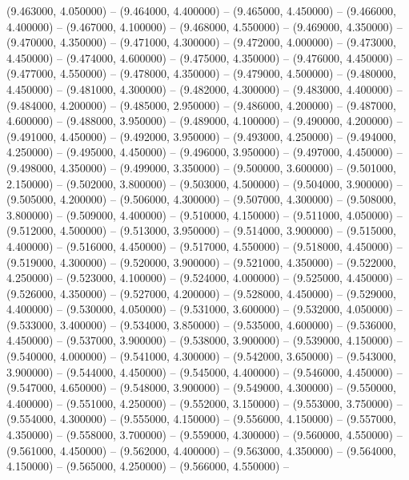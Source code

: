 (9.463000, 4.050000) -- 
(9.464000, 4.400000) -- 
(9.465000, 4.450000) -- 
(9.466000, 4.400000) -- 
(9.467000, 4.100000) -- 
(9.468000, 4.550000) -- 
(9.469000, 4.350000) -- 
(9.470000, 4.350000) -- 
(9.471000, 4.300000) -- 
(9.472000, 4.000000) -- 
(9.473000, 4.450000) -- 
(9.474000, 4.600000) -- 
(9.475000, 4.350000) -- 
(9.476000, 4.450000) -- 
(9.477000, 4.550000) -- 
(9.478000, 4.350000) -- 
(9.479000, 4.500000) -- 
(9.480000, 4.450000) -- 
(9.481000, 4.300000) -- 
(9.482000, 4.300000) -- 
(9.483000, 4.400000) -- 
(9.484000, 4.200000) -- 
(9.485000, 2.950000) -- 
(9.486000, 4.200000) -- 
(9.487000, 4.600000) -- 
(9.488000, 3.950000) -- 
(9.489000, 4.100000) -- 
(9.490000, 4.200000) -- 
(9.491000, 4.450000) -- 
(9.492000, 3.950000) -- 
(9.493000, 4.250000) -- 
(9.494000, 4.250000) -- 
(9.495000, 4.450000) -- 
(9.496000, 3.950000) -- 
(9.497000, 4.450000) -- 
(9.498000, 4.350000) -- 
(9.499000, 3.350000) -- 
(9.500000, 3.600000) -- 
(9.501000, 2.150000) -- 
(9.502000, 3.800000) -- 
(9.503000, 4.500000) -- 
(9.504000, 3.900000) -- 
(9.505000, 4.200000) -- 
(9.506000, 4.300000) -- 
(9.507000, 4.300000) -- 
(9.508000, 3.800000) -- 
(9.509000, 4.400000) -- 
(9.510000, 4.150000) -- 
(9.511000, 4.050000) -- 
(9.512000, 4.500000) -- 
(9.513000, 3.950000) -- 
(9.514000, 3.900000) -- 
(9.515000, 4.400000) -- 
(9.516000, 4.450000) -- 
(9.517000, 4.550000) -- 
(9.518000, 4.450000) -- 
(9.519000, 4.300000) -- 
(9.520000, 3.900000) -- 
(9.521000, 4.350000) -- 
(9.522000, 4.250000) -- 
(9.523000, 4.100000) -- 
(9.524000, 4.000000) -- 
(9.525000, 4.450000) -- 
(9.526000, 4.350000) -- 
(9.527000, 4.200000) -- 
(9.528000, 4.450000) -- 
(9.529000, 4.400000) -- 
(9.530000, 4.050000) -- 
(9.531000, 3.600000) -- 
(9.532000, 4.050000) -- 
(9.533000, 3.400000) -- 
(9.534000, 3.850000) -- 
(9.535000, 4.600000) -- 
(9.536000, 4.450000) -- 
(9.537000, 3.900000) -- 
(9.538000, 3.900000) -- 
(9.539000, 4.150000) -- 
(9.540000, 4.000000) -- 
(9.541000, 4.300000) -- 
(9.542000, 3.650000) -- 
(9.543000, 3.900000) -- 
(9.544000, 4.450000) -- 
(9.545000, 4.400000) -- 
(9.546000, 4.450000) -- 
(9.547000, 4.650000) -- 
(9.548000, 3.900000) -- 
(9.549000, 4.300000) -- 
(9.550000, 4.400000) -- 
(9.551000, 4.250000) -- 
(9.552000, 3.150000) -- 
(9.553000, 3.750000) -- 
(9.554000, 4.300000) -- 
(9.555000, 4.150000) -- 
(9.556000, 4.150000) -- 
(9.557000, 4.350000) -- 
(9.558000, 3.700000) -- 
(9.559000, 4.300000) -- 
(9.560000, 4.550000) -- 
(9.561000, 4.450000) -- 
(9.562000, 4.400000) -- 
(9.563000, 4.350000) -- 
(9.564000, 4.150000) -- 
(9.565000, 4.250000) -- 
(9.566000, 4.550000) -- 
